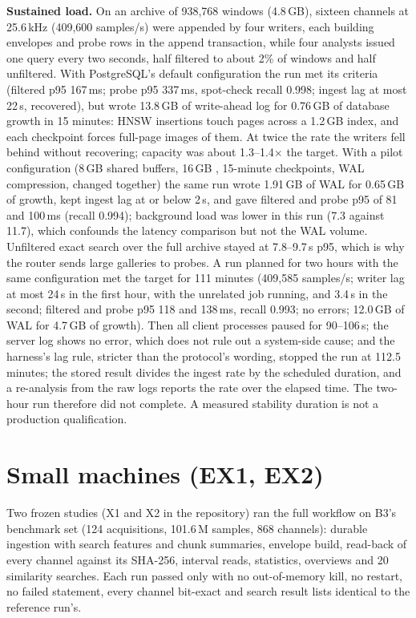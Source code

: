 \documentclass[sigconf,nonacm]{acmart}
\begin{document}
\textbf{Sustained load.} On an archive of 938,768 windows (4.8\,GB), sixteen channels at 25.6\,kHz (409,600 samples/s) were appended by four writers, each building envelopes and probe rows in the append transaction, while four analysts issued one query every two seconds, half filtered to about 2\% of windows and half unfiltered. With PostgreSQL's default configuration the run met its criteria (filtered p95 167\,ms; probe p95 337\,ms, spot-check recall 0.998; ingest lag at most 22\,s, recovered), but wrote 13.8\,GB of write-ahead log for 0.76\,GB of database growth in 15 minutes: HNSW insertions touch pages across a 1.2\,GB index, and each checkpoint forces full-page images of them. At twice the rate the writers fell behind without recovering; capacity was about 1.3--1.4$\times$ the target. With a pilot configuration (8\,GB shared buffers, 16\,GB , 15-minute checkpoints, WAL compression, changed together) the same run wrote 1.91\,GB of WAL for 0.65\,GB of growth, kept ingest lag at or below 2\,s, and gave filtered and probe p95 of 81 and 100\,ms (recall 0.994); background load was lower in this run (7.3 against 11.7), which confounds the latency comparison but not the WAL volume. Unfiltered exact search over the full archive stayed at 7.8--9.7\,s p95, which is why the router sends large galleries to probes. A run planned for two hours with the same configuration met the target for 111 minutes (409,585 samples/s; writer lag at most 24\,s in the first hour, with the unrelated job running, and 3.4\,s in the second; filtered and probe p95 118 and 138\,ms, recall 0.993; no errors; 12.0\,GB of WAL for 4.7\,GB of growth). Then all client processes paused for 90--106\,s; the server log shows no error, which does not rule out a system-side cause; and the harness's lag rule, stricter than the protocol's wording, stopped the run at 112.5 minutes; the stored result divides the ingest rate by the scheduled duration, and a re-analysis from the raw logs reports the rate over the elapsed time. The two-hour run therefore did not complete. A measured stability duration is not a production qualification.

\section{Small machines (EX1, EX2)}\label{sec:edge}
Two frozen studies (X1 and X2 in the repository) ran the full workflow on B3's benchmark set (124 acquisitions, 101.6\,M samples, 868 channels): durable ingestion with search features and chunk summaries, envelope build, read-back of every channel against its SHA-256, interval reads, statistics, overviews and 20 similarity searches. Each run passed only with no out-of-memory kill, no restart, no failed statement, every channel bit-exact and search result lists identical to the reference run's.
\end{document}

